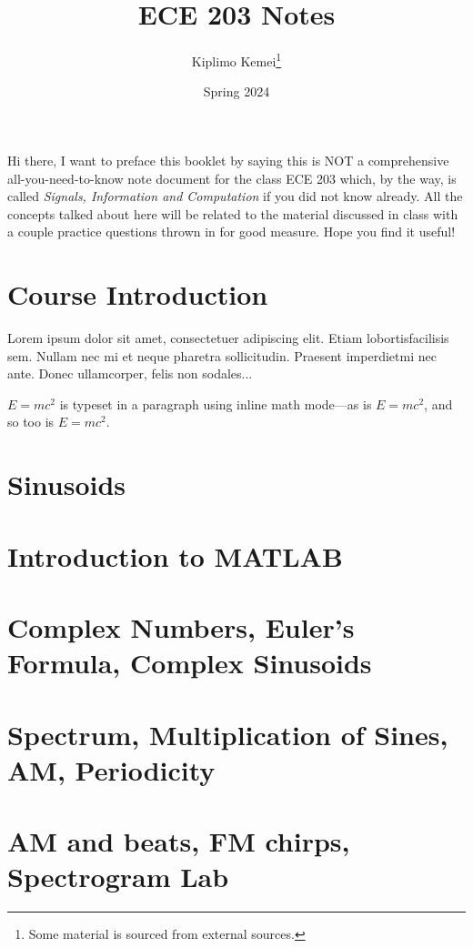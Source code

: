 \documentclass[12pt, letterpaper]{article}
\title{ECE 203 Notes}
\author{Kiplimo Kemei\thanks{Some material is sourced from external sources.}}
\date{Spring 2024}
\begin{document}
\maketitle
Hi there, I want to preface this booklet by saying this is NOT a comprehensive 
all-you-need-to-know note document for the class ECE 203 which,
by the way, is called \emph{Signals, Information and Computation} if you 
did not know already. All the concepts talked about here will 
be related to the material discussed in class with a couple practice 
questions thrown in for good measure. Hope you find it useful!

\newpage
\thispagestyle{plain}
\tableofcontents
\newpage
\thispagestyle{plain}
\section{Course Introduction}      
Lorem  ipsum  dolor  sit  amet,  consectetuer  adipiscing  
elit.   Etiam  lobortisfacilisis sem.  Nullam nec mi et 
neque pharetra sollicitudin.  Praesent imperdietmi nec ante. 
Donec ullamcorper, felis non sodales...

\space
\begin{math}
    E=mc^2
\end{math} is typeset in a paragraph using inline math mode---as is $E=mc^2$, and so too is \(E=mc^2\).

\newpage

\section{Sinusoids}   
\thispagestyle{plain}
\newpage
\section{Introduction to MATLAB}  
\thispagestyle{plain}

\newpage
\section{Complex Numbers, Euler's Formula, Complex Sinusoids} 

\newpage
\section{Spectrum, Multiplication of Sines, AM, Periodicity}
\section{AM and beats, FM chirps, Spectrogram Lab}
\end{document}
